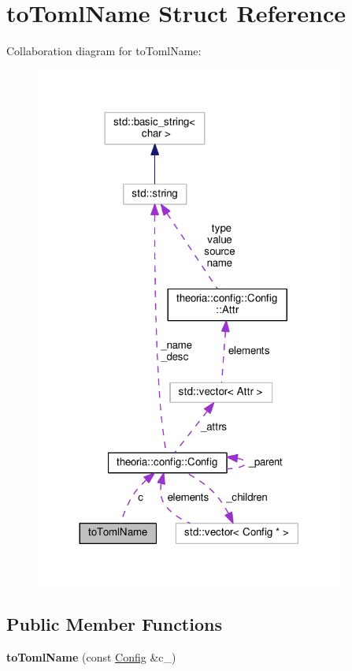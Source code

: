 \hypertarget{structtoTomlName}{}\section{to\+Toml\+Name Struct Reference}
\label{structtoTomlName}


Collaboration diagram for to\+Toml\+Name\+:\nopagebreak
\begin{figure}[H]
\begin{center}
\leavevmode
\includegraphics[width=288pt]{structtoTomlName__coll__graph}
\end{center}
\end{figure}
\subsection*{Public Member Functions}
\begin{DoxyCompactItemize}
\item 
\mbox{\label{structtoTomlName_af8c07f9b89f61b4c54e942c0bfe3e544}} 
{\bfseries to\+Toml\+Name} (const \hyperlink{classtheoria_1_1config_1_1Config}{Config} \&c\+\_\+)
\end{DoxyCompactItemize}
